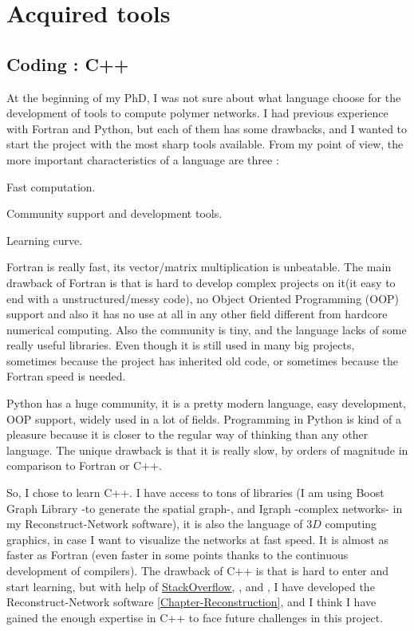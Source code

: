
\chapter{Acquired tools} %

\label{Appendix-tools} %


\section{Coding : C++}
At the beginning of my PhD, I was not sure about what language choose for the
development of tools to compute polymer networks. I had previous experience with
Fortran and Python, but each of them has some drawbacks, and I wanted to start
the project with the most sharp tools available. From my point of
view, the more important characteristics of a language are three :
\begin{enumerate*}[label=\bfseries\alph*)]
\item Fast computation. 
\item Community support and development tools.
\item Learning curve.
\end{enumerate*}
 
Fortran is really fast, its vector/matrix multiplication is unbeatable. The main
drawback of Fortran is that is hard to develop complex projects on it(it easy
to end with a unstructured/messy code), no Object Oriented Programming (OOP)
support and also it has no use at all in any other field different from hardcore numerical computing. Also the community is
tiny, and the language lacks of some really useful libraries.
Even though it is still used in many big projects, sometimes because the project has inherited old code,
 or sometimes because the Fortran speed is needed. 

Python has a huge community, it is a pretty modern language, easy development,
OOP support, widely used in a lot of fields. Programming in Python is kind of a
pleasure because it is closer to the regular way of thinking than any other
language. The unique drawback is that it is really slow, by orders of magnitude
in comparison to Fortran or C++. 

So, I chose to learn C++. I have access to tons of libraries (I am using
Boost Graph Library -to generate the spatial graph-, and Igraph -complex
networks- in my Reconstruct-Network software), it is also the language of $3D$  computing
graphics, in case I want to visualize the networks at fast speed.  It is almost
as faster as Fortran (even faster in some points thanks to the continuous
development of compilers). The drawback of C++ is that is hard to enter and
start learning, but with help of
\href{http://www.stackoverflow.com}{StackOverflow},
\citet{stroustrup_c++_2013}, and \citet{lippman_c++_2013}, I have developed the
Reconstruct-Network software \ref{Chapter-Reconstruction}, and I think I have gained the enough expertise in C++ to face future challenges in this project.

